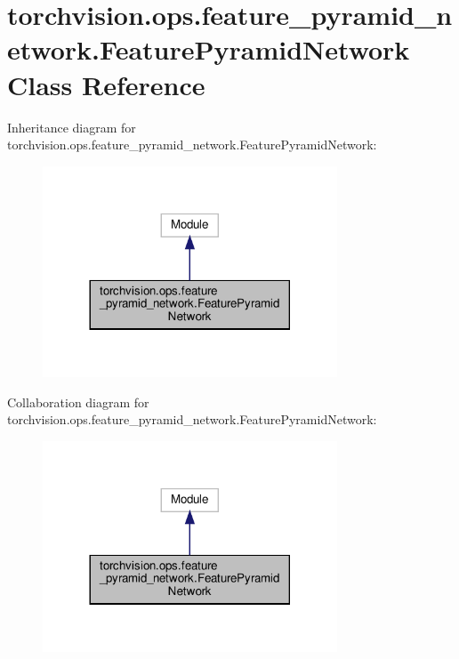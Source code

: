 \hypertarget{classtorchvision_1_1ops_1_1feature__pyramid__network_1_1FeaturePyramidNetwork}{}\section{torchvision.\+ops.\+feature\+\_\+pyramid\+\_\+network.\+Feature\+Pyramid\+Network Class Reference}
\label{classtorchvision_1_1ops_1_1feature__pyramid__network_1_1FeaturePyramidNetwork}


Inheritance diagram for torchvision.\+ops.\+feature\+\_\+pyramid\+\_\+network.\+Feature\+Pyramid\+Network\+:
\nopagebreak
\begin{figure}[H]
\begin{center}
\leavevmode
\includegraphics[width=248pt]{classtorchvision_1_1ops_1_1feature__pyramid__network_1_1FeaturePyramidNetwork__inherit__graph}
\end{center}
\end{figure}


Collaboration diagram for torchvision.\+ops.\+feature\+\_\+pyramid\+\_\+network.\+Feature\+Pyramid\+Network\+:
\nopagebreak
\begin{figure}[H]
\begin{center}
\leavevmode
\includegraphics[width=248pt]{classtorchvision_1_1ops_1_1feature__pyramid__network_1_1FeaturePyramidNetwork__coll__graph}
\end{center}
\end{figure}

